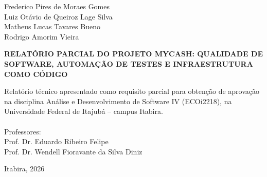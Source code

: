 \documentclass[12pt,a4paper]{article}
\begin{document}
\begin{titlepage}
    \begin{center}
        Frederico Pires de Moraes Gomes \\
        Luiz Otávio de Queiroz Lage Silva \\
        Matheus Lucas Tavares Bueno \\
        Rodrigo Amorim Vieira

        \vspace{5cm}

        \textbf{RELATÓRIO PARCIAL DO PROJETO MYCASH: QUALIDADE DE SOFTWARE, AUTOMAÇÃO DE TESTES E INFRAESTRUTURA COMO CÓDIGO}

        \vspace{3cm}

        \begin{flushright}
            \begin{minipage}{8cm}
                Relatório técnico apresentado como requisito parcial para obtenção de aprovação na disciplina Análise e Desenvolvimento de Software IV (ECOi2218), na Universidade Federal de Itajubá -- campus Itabira. \\
                \\
                Professores: \\
                Prof. Dr. Eduardo Ribeiro Felipe \\
                Prof. Dr. Wendell Fioravante da Silva Diniz
            \end{minipage}
        \end{flushright}

        \vfill

        Itabira, 2026
    \end{center}
\end{titlepage}
\end{document}
